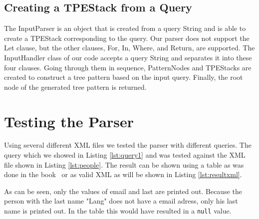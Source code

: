 \documentclass[11pt]{article}
\begin{document}
\subsection{Creating a TPEStack from a Query}
The InputParser is an object that is created from a query String and is able to create a TPEStack corresponding to the query. Our parser does not support the Let clause, but the other clauses, For, In, Where, and Return, are supported. The InputHandler class of our code accepts a query String and separates it into these four clauses. Going through them in sequence, PatternNodes and TPEStacks are created to construct a tree pattern based on the input query. Finally, the root node of the generated tree pattern is returned.

\section{Testing the Parser}
Using several different XML files we tested the parser with different queries. The query which we showed in Listing \ref{lst:query1} and was tested against the XML file shown in Listing \ref{lst:people}. The result can be shown using a table as was done in the book~\cite{abiteboul2012web} or as valid XML as will be shown in Listing \ref{lst:resultxml}.



As can be seen, only the values of email and last are printed out. Because the person with the last name "Lang" does not have a email adress, only his last name is printed out. In the table this would have resulted in a \lstinline{null} value. 
\end{document}
